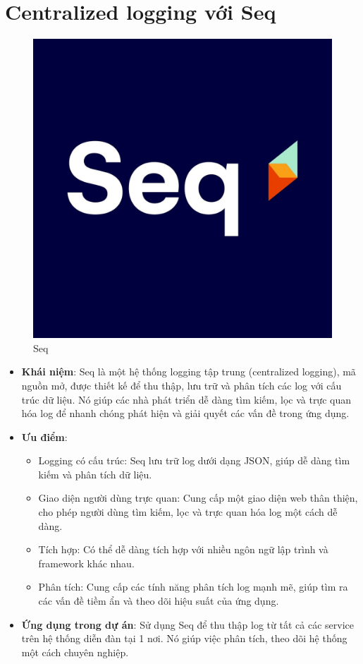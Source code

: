 \documentclass[../index.tex]{subfiles}
\begin{document}
    \section{Centralized logging với Seq}
    \begin{figure}[H]
        \centering
        \includegraphics[width=0.2\linewidth]{figures/tech-logo/seq.jpg}
        \caption{Seq}
    \end{figure}
    \begin{itemize}
        \item \textbf{Khái niệm}: Seq là một hệ thống logging tập trung (centralized
            logging), mã nguồn mở, được thiết kế để thu thập, lưu trữ và phân
            tích các log với cấu trúc dữ liệu. Nó giúp các nhà phát triển dễ dàng
            tìm kiếm, lọc và trực quan hóa log để nhanh chóng phát hiện và giải
            quyết các vấn đề trong ứng dụng.

        \item \textbf{Ưu điểm}:
            \begin{itemize}
                \item Logging có cấu trúc: Seq lưu trữ log dưới dạng JSON, giúp dễ
                    dàng tìm kiếm và phân tích dữ liệu.

                \item Giao diện người dùng trực quan: Cung cấp một giao diện web
                    thân thiện, cho phép người dùng tìm kiếm, lọc và trực quan
                    hóa log một cách dễ dàng.

                \item Tích hợp: Có thể dễ dàng tích hợp với nhiều ngôn ngữ lập
                    trình và framework khác nhau.

                \item Phân tích: Cung cấp các tính năng phân tích log mạnh mẽ, giúp
                    tìm ra các vấn đề tiềm ẩn và theo dõi hiệu suất của ứng dụng.
            \end{itemize}

        \item \textbf{Ứng dụng trong dự án}: Sử dụng Seq để thu thập log từ tất cả
            các service trên hệ thống diễn đàn tại 1 nơi. Nó giúp việc phân tích,
            theo dõi hệ thống một cách chuyên nghiệp.
    \end{itemize}
\end{document}
